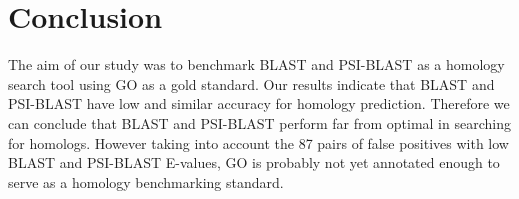 \documentclass{article}
\begin{document}
\newpage
\section{Conclusion}

The aim of our study was to benchmark BLAST and PSI-BLAST as a homology search tool using GO as a gold standard. Our results indicate that BLAST and PSI-BLAST have low and similar accuracy for homology prediction. Therefore we can conclude that BLAST and PSI-BLAST perform far from optimal in searching for homologs. However taking into account the 87 pairs of false positives with low BLAST and PSI-BLAST E-values, GO is probably not yet annotated enough to serve as a homology benchmarking standard.

\newpage


\end{document}
